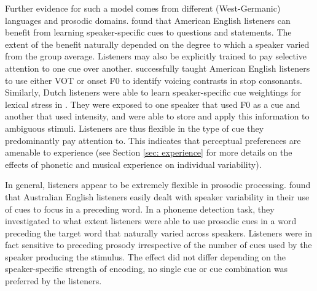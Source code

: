 Further evidence for such a model comes from different (West-Germanic) languages and prosodic domains. \citet{xieEncodingDecodingMeaning2021} found that American English listeners can benefit from learning speaker-specific cues to questions and statements. The extent of the benefit naturally depended on the degree to which a speaker varied from the group average. Listeners may also be explicitly trained to pay selective attention to one cue over another. \citet{francisCuespecificEffectsCategorization2008} successfully taught American English listeners to use either VOT or onset F0 to identify voicing contrasts in stop consonants. Similarly, Dutch listeners were able to learn speaker-specific cue weightings for lexical stress in \citet{severijnenTrackingTalkerspecificCues2023}. They were exposed to one speaker that used F0 as a cue and another that used intensity, and were able to store and apply this information to ambiguous stimuli. Listeners are thus flexible in the type of cue they predominantly pay attention to. This indicates that perceptual preferences are amenable to experience (see Section \ref{sec: experience} for more details on the effects of phonetic and musical experience on individual variability).

In general, listeners appear to be extremely flexible in prosodic processing. \citet{ipSearchSalienceFocus2021} found that Australian English listeners easily dealt with speaker variability in their use of cues to focus in a preceding word. In a phoneme detection task, they investigated to what extent listeners were able to use prosodic cues in a word preceding the target word that naturally varied across speakers. Listeners were in fact sensitive to preceding prosody irrespective of the number of cues used by the speaker producing the stimulus. The effect did not differ depending on the speaker-specific strength of encoding, no single cue or cue combination was preferred by the listeners.

